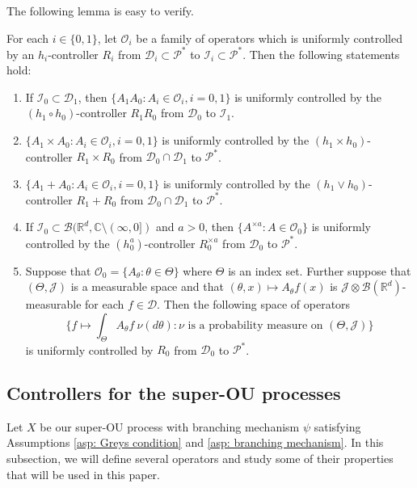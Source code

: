 \documentclass[EJP]{ejpecp} %
\begin{document}
The following lemma is easy to verify.
\begin{lemma}
  \label{lem: property of controllable operators}
  For each $i \in \{0,1\}$, let $\mathscr O_i$ be a family of operators which is  uniformly controlled by an $h_i$-controller $R_i$ from $\mathcal D_i \subset \mathcal P^*$ to $ \mathcal I_i \subset \mathcal P^*$.
  Then the following statements hold:
  \begin{enumerate}
  \item
    If $\mathcal I_0 \subset \mathcal D_1$, then $\{A_1A_0: A_i \in \mathscr O_i, i = 0,1\}$ is uniformly controlled by the $(h_1 \circ h_0)$-controller $R_1R_0$ from $\mathcal D_0$ to $\mathcal I_1$.
  \item
    $\{ A_1 \times A_0: A_i \in \mathscr O_i, i = 0,1\}$ is uniformly controlled by the $(h_1\times h_0)$-controller $R_1 \times R_0$ from $\mathcal D_0 \cap \mathcal D_1$ to $\mathcal P^*$.
  \item
    $\{ A_1 + A_0: A_i \in \mathscr O_i, i = 0,1\}$ is uniformly controlled by the $(h_1 \vee h_0)$-controller $R_1 + R_0$ from $\mathcal D_0 \cap \mathcal D_1$ to $\mathcal P^*$.
  \item
    If $\mathcal I_0 \subset \mathcal B(\mathbb R^d, \mathbb C \setminus (\infty, 0])$ and $a>0$, then $\{A^{\times a} : A \in \mathscr O_0\}$ is uniformly controlled by the $(h_0^a)$-controller $R_0^{\times a}$ from $\mathcal D_0$ to $\mathcal P^*$.
  \item
    Suppose that $\mathscr O_0 = \{A_\theta: \theta \in \Theta \}$ where $\Theta$ is an index set.
    Further suppose that $(\Theta, \mathcal J )$ is a measurable space and that $(\theta,x) \mapsto A_\theta f(x)$ is $\mathcal J \otimes \mathcal B(\mathbb R^d)$-measurable for each $f\in \mathcal D$.
    Then the following space of operators
    \[
      \Big\{ f \mapsto \int_{\Theta} A_\theta f~\nu(d\theta) : \nu \text{ is a probability measure on } (\Theta, \mathcal J) \Big\}
    \]
    is uniformly controlled by $R_0$ from $\mathcal D_0$ to $\mathcal P^*$.
  \end{enumerate}
\end{lemma}

\subsection{Controllers for the super-OU processes}
\label{sec: h-controller}
Let $X$ be our super-OU process with branching mechanism $\psi$ satisfying
Assumptions \ref{asp: Greys condition} and \ref{asp: branching mechanism}.
In this subsection, we will define several operators and study some of their properties that will be used in this paper.
\end{document}
